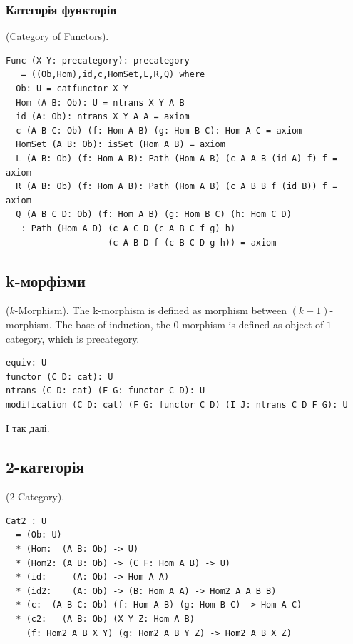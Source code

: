 \subsubsection{Категорія функторів}
\begin{definition} (Category of Functors).
\begin{lstlisting}
Func (X Y: precategory): precategory
   = ((Ob,Hom),id,c,HomSet,L,R,Q) where
  Ob: U = catfunctor X Y
  Hom (A B: Ob): U = ntrans X Y A B
  id (A: Ob): ntrans X Y A A = axiom
  c (A B C: Ob) (f: Hom A B) (g: Hom B C): Hom A C = axiom
  HomSet (A B: Ob): isSet (Hom A B) = axiom
  L (A B: Ob) (f: Hom A B): Path (Hom A B) (c A A B (id A) f) f = axiom
  R (A B: Ob) (f: Hom A B): Path (Hom A B) (c A B B f (id B)) f = axiom
  Q (A B C D: Ob) (f: Hom A B) (g: Hom B C) (h: Hom C D)
   : Path (Hom A D) (c A C D (c A B C f g) h)
                    (c A B D f (c B C D g h)) = axiom
\end{lstlisting}
\end{definition}

\subsection{k-морфізми}

\begin{definition} ($k$-Morphism).
The k-morphism is defined as morphism
between $(k-1)$-morphism. The base of induction, the $0$-morphism is
defined as object of $1$-category, which is precategory.
\begin{lstlisting}
equiv: U
functor (C D: cat): U
ntrans (C D: cat) (F G: functor C D): U
modification (C D: cat) (F G: functor C D) (I J: ntrans C D F G): U
\end{lstlisting}
І так далі.
\end{definition}

\subsection{2-категорія}
\begin{definition} (2-Category).
\begin{lstlisting}
Cat2 : U
  = (Ob: U)
  * (Hom:  (A B: Ob) -> U)
  * (Hom2: (A B: Ob) -> (C F: Hom A B) -> U)
  * (id:     (A: Ob) -> Hom A A)
  * (id2:    (A: Ob) -> (B: Hom A A) -> Hom2 A A B B)
  * (c:  (A B C: Ob) (f: Hom A B) (g: Hom B C) -> Hom A C)
  * (c2:   (A B: Ob) (X Y Z: Hom A B)
    (f: Hom2 A B X Y) (g: Hom2 A B Y Z) -> Hom2 A B X Z)
\end{lstlisting}
\end{definition}

